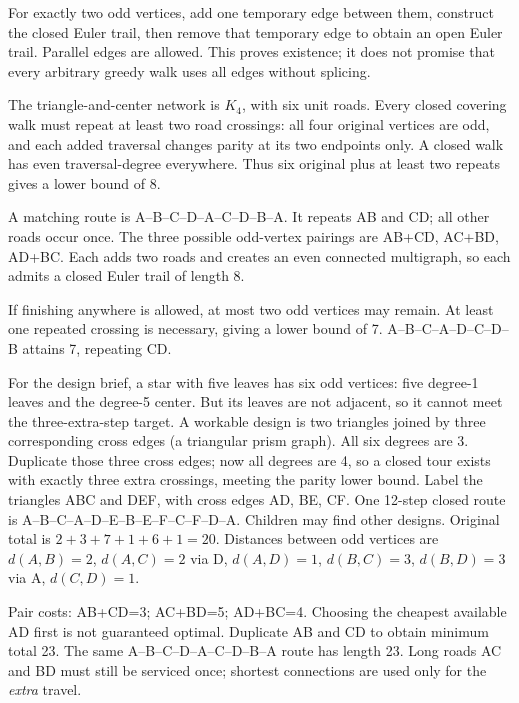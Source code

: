 \documentclass[11pt]{article}
\begin{document}
For exactly two odd vertices, add one temporary edge between them, construct the closed Euler trail, then remove that temporary edge to obtain an open Euler trail. Parallel edges are allowed. This proves existence; it does not promise that every arbitrary greedy walk uses all edges without splicing.

\newpage

The triangle-and-center network is $K_4$, with six unit roads. Every closed covering walk must repeat at least two road crossings: all four original vertices are odd, and each added traversal changes parity at its two endpoints only. A closed walk has even traversal-degree everywhere. Thus six original plus at least two repeats gives a lower bound of 8.

A matching route is A--B--C--D--A--C--D--B--A. It repeats AB and CD; all other roads occur once. The three possible odd-vertex pairings are AB+CD, AC+BD, AD+BC. Each adds two roads and creates an even connected multigraph, so each admits a closed Euler trail of length 8.

If finishing anywhere is allowed, at most two odd vertices may remain. At least one repeated crossing is necessary, giving a lower bound of 7. A--B--C--A--D--C--D--B attains 7, repeating CD.

For the design brief, a star with five leaves has six odd vertices: five degree-1 leaves and the degree-5 center. But its leaves are not adjacent, so it cannot meet the three-extra-step target. A workable design is two triangles joined by three corresponding cross edges (a triangular prism graph). All six degrees are 3. Duplicate those three cross edges; now all degrees are 4, so a closed tour exists with exactly three extra crossings, meeting the parity lower bound. Label the triangles ABC and DEF, with cross edges AD, BE, CF. One 12-step closed route is A--B--C--A--D--E--B--E--F--C--F--D--A. Children may find other designs.
Original total is $2+3+7+1+6+1=20$. Distances between odd vertices are $d(A,B)=2$, $d(A,C)=2$ via D, $d(A,D)=1$, $d(B,C)=3$, $d(B,D)=3$ via A, $d(C,D)=1$.

Pair costs: AB+CD=3; AC+BD=5; AD+BC=4. Choosing the cheapest available AD first is not guaranteed optimal. Duplicate AB and CD to obtain minimum total 23. The same A--B--C--D--A--C--D--B--A route has length 23. Long roads AC and BD must still be serviced once; shortest connections are used only for the \emph{extra} travel.
\end{document}
